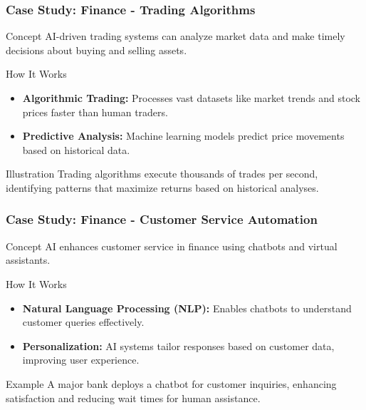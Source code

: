\documentclass[aspectratio=169]{beamer}
\begin{document}
\begin{frame}[fragile]
    \frametitle{Case Study: Finance - Trading Algorithms}
    \begin{block}{Concept}
        AI-driven trading systems can analyze market data and make timely decisions about buying and selling assets.
    \end{block}
    
    \begin{block}{How It Works}
        \begin{itemize}
            \item \textbf{Algorithmic Trading:} Processes vast datasets like market trends and stock prices faster than human traders.
            \item \textbf{Predictive Analysis:} Machine learning models predict price movements based on historical data.
        \end{itemize}
    \end{block}
    
    \begin{exampleblock}{Illustration}
        Trading algorithms execute thousands of trades per second, identifying patterns that maximize returns based on historical analyses.
    \end{exampleblock}
\end{frame}

\begin{frame}[fragile]
    \frametitle{Case Study: Finance - Customer Service Automation}
    \begin{block}{Concept}
        AI enhances customer service in finance using chatbots and virtual assistants.
    \end{block}
    
    \begin{block}{How It Works}
        \begin{itemize}
            \item \textbf{Natural Language Processing (NLP):} Enables chatbots to understand customer queries effectively.
            \item \textbf{Personalization:} AI systems tailor responses based on customer data, improving user experience.
        \end{itemize}
    \end{block}
    
    \begin{exampleblock}{Example}
        A major bank deploys a chatbot for customer inquiries, enhancing satisfaction and reducing wait times for human assistance.
    \end{exampleblock}
\end{frame}
\end{document}
